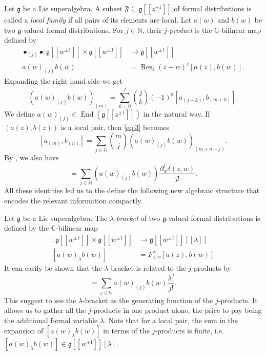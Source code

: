 \documentclass[a4paper, 12pt, reqno]{amsart}
\theoremstyle{remark}
\numberwithin{equation}{subsection}
\DeclareMathOperator{\End}{End}
\DeclareMathOperator{\Res}{Res}
\begin{document}
Let $\mathfrak{g}$ be a Lie superalgebra.
A subset $\mathfrak{F} \subseteq \mathfrak{g}[[z^{\pm 1}]]$ of formal distributions is called a \emph{local family} if all pairs of its elements are local.
Let $a(w)$ and $b(w)$ be two $\mathfrak{g}$-valued formal distributions.
For $j \in \mathbb{N}$, their \emph{$j$-product} is the $\mathbb{C}$-bilinear map defined by
\begin{align}
  \nonumber
  \bullet_{(j)}\bullet: \mathfrak{g}[[w^{\pm 1}]] \times \mathfrak{g}[[w^{\pm 1}]] &\to \mathfrak{g}[[w^{\pm 1}]]\\
  \label{eq:4}
  a(w)_{(j)}b(w) &= \Res_z(z - w)^j[a(z), b(w)].
\end{align}
Expanding the right hand side we get
\begin{equation}
  \label{eq:5}
  (a(w)_{(j)}b(w))_{(m)} = \sum_{k = 0}^j\binom{j}{k}(-1)^k[a_{(j - k)},b_{(m + k)}].
\end{equation}
We define $a(w)_{(j)} \in \End(\mathfrak{g}[[z^{\pm 1}]])$ in the natural way.
If $(a(z), b(z))$ is a local pair, then \eqref{eq:3} becomes
\begin{equation}
  \label{eq:6}
  [a_{(m)}, b_{(n)}] = \sum_{j \in \mathbb{N}}\binom{m}{j}(a(w)_{(j)}b(w))_{(m + n - j)}.
\end{equation}
By , we also have
\begin{equation*}
  [a(z),b(w)]=\sum_{j \in \mathbb{N}}(a(w)_{(j)}b(w))\frac{\partial_w^j\delta(z,w)}{j!}.
\end{equation*}
All these identities led us to the define the following new algebraic structure that encodes the relevant information compactly.

Let $\mathfrak{g}$ be a Lie superalgebra.
The \emph{$\lambda$-bracket} of two $\mathfrak{g}$-valued formal distributions is defined by the $\mathbb{C}$-bilinear map
\begin{align*}
  [\bullet_{\lambda}\bullet]: \mathfrak{g}[[w^{\pm 1}]] \times \mathfrak{g}[[w^{\pm 1}]] &\to \mathfrak{g}[[w^{\pm 1}]][[\lambda]] \\
  [a(w)_{\lambda}b(w)] &= F^{\lambda}_{z, w}[a(z), b(w)]
\end{align*}
It can easily be shown that the $\lambda$-bracket is related to the $j$-products by
\begin{equation*}
  [a(w)_{\lambda}b(w)] = \sum_{j \in \mathbb{N}}a(w)_{(j)}b(w)\frac{\lambda^j}{j!}.
\end{equation*}
This suggest to see the $\lambda$-bracket as the generating function of the $j$-products.
It allows us to gather all the $j$-products in one product alone, the price to pay being the additional formal variable $\lambda$.
Note that for a local pair, the sum in the expansion of $[a(w)_{\lambda} b(w)]$ in terms of the $j$-products is finite, i.e.\ $[a(w)_{\lambda}b(w)] \in \mathfrak{g}[[w^{\pm 1}]][\lambda]$.
\end{document}
